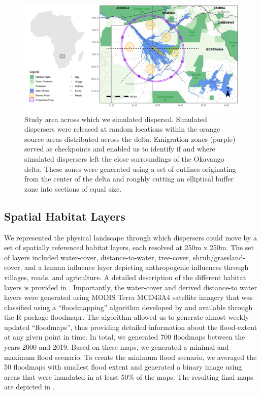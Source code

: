 \documentclass[abstract=on,10pt,a4paper,bibliography=totocnumbered]{article}
\begin{document}
\begin{figure}
  \begin{center}
  \includegraphics[width = \textwidth]{99_StudyArea.png}
  \caption{Study area across which we simulated dispersal. Simulated dispersers
  were released at random locations within the orange source areas distributed
  across the delta. Emigration zones (purple) served as checkpoints and enabled
  us to identify if and where simulated dispersers left the close surroundings
  of the Okavango delta. These zones were generated using a set of cutlines
  originating from the center of the delta and roughly cutting an elliptical
  buffer zone into sections of equal size.}
  \label{StudyArea}
  \end{center}
\end{figure}

\subsection{Spatial Habitat Layers}
We represented the physical landscape through which dispersers could move by a
set of spatially referenced habitat layers, each resolved at 250m x 250m. The
set of layers included water-cover, distance-to-water, tree-cover,
shrub/grassland-cover, and a human influence layer depicting anthropogenic
influences through villages, roads, and agriculture. A detailed description of
the different habitat layers is provided in . Importantly,
the water-cover and derived distance-to water layers were generated using MODIS
Terra MCD43A4 satellite imagery that was classified using a ``floodmapping''
algorithm developed by \citep{Wolski.2017} and available through the R-package
\textsf{floodmapr}. The algorithm allowed us to generate almost weekly updated
``floodmaps'', thus providing detailed information about the flood-extent at any
given point in time. In total, we generated 700 floodmaps between the years 2000
and 2019. Based on these maps, we generated a minimal and maximum flood
scenario. To create the minimum flood scenario, we averaged the 50 floodmaps
with smallest flood extent and generated a binary image using areas that were
inundated in at least 50\% of the maps. The resulting final maps are depicted in
.
\end{document}
